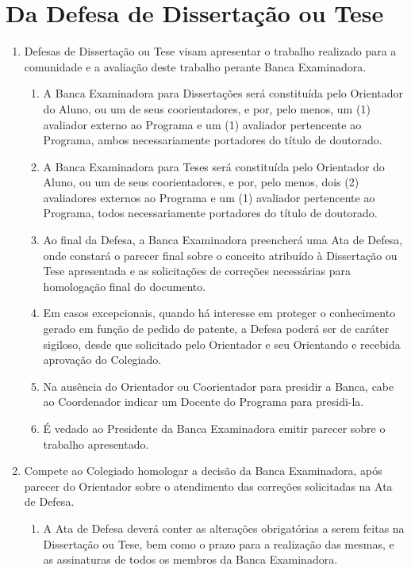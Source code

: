 \documentclass{article}
\newcommand{\singleitem}{\item[Parágrafo Único.]}
\newcommand{\grupoMenor}{Colegiado\xspace}
\begin{document}
\section{Da Defesa de Dissertação ou Tese}

\begin{enumerate}
	\item Defesas de Dissertação ou Tese visam apresentar o trabalho realizado para a comunidade e a avaliação deste trabalho perante Banca Examinadora.
	\begin{enumerate}
		\item A Banca Examinadora para Dissertações será constituída pelo Orientador do Aluno, ou um de seus coorientadores, e por, pelo menos, um (1) avaliador externo ao Programa e um (1) avaliador pertencente ao Programa, ambos necessariamente portadores do título de doutorado.

		\item A Banca Examinadora para Teses será constituída  pelo Orientador do Aluno, ou um de seus coorientadores, e por, pelo menos, dois (2) avaliadores externos ao Programa e um (1) avaliador pertencente ao Programa, todos necessariamente portadores do título de doutorado.

		\item Ao final da Defesa, a Banca Examinadora preencherá uma Ata de Defesa, onde constará o parecer final sobre o conceito atribuído à Dissertação ou Tese apresentada e as solicitações de correções necessárias para homologação final do documento.

		\item Em casos excepcionais, quando há interesse em proteger o conhecimento gerado em função de pedido de patente, a Defesa poderá ser de caráter sigiloso, desde que solicitado pelo Orientador e seu Orientando e recebida aprovação do \grupoMenor.

		\item Na ausência do Orientador ou Coorientador para presidir a Banca, cabe ao Coordenador indicar um Docente do Programa para presidi-la.

		\item É vedado ao Presidente da Banca Examinadora emitir parecer sobre o trabalho apresentado.
	\end{enumerate}

	\item Compete ao \grupoMenor  homologar a decisão da Banca Examinadora, após parecer do Orientador sobre o atendimento das correções solicitadas na Ata de Defesa.
	\begin{enumerate}
		\singleitem A Ata de Defesa deverá conter as alterações obrigatórias a serem feitas na Dissertação ou Tese, bem como o prazo para a realização das mesmas, e as assinaturas de todos os membros da Banca Examinadora.
	\end{enumerate}


\end{enumerate}
\end{document}
